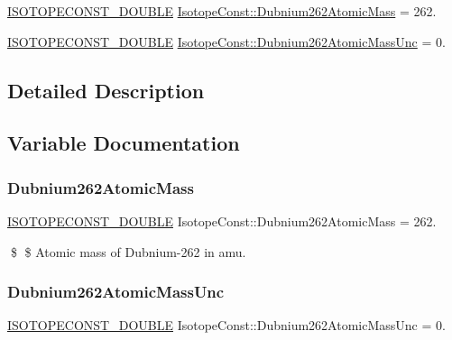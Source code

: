 \begin{DoxyCompactItemize}
\item 
\mbox{\hyperlink{group___isotope_const-_macros_ga8f45a7272ce02c0b4c65c44636ed719a}{I\+S\+O\+T\+O\+P\+E\+C\+O\+N\+S\+T\+\_\+\+D\+O\+U\+B\+LE}} \mbox{\hyperlink{group___isotope_const-_dubnium-_db262_ga25b5041543884ed2576ce04ff62130be}{Isotope\+Const\+::\+Dubnium262\+Atomic\+Mass}} = 262.
\item 
\mbox{\hyperlink{group___isotope_const-_macros_ga8f45a7272ce02c0b4c65c44636ed719a}{I\+S\+O\+T\+O\+P\+E\+C\+O\+N\+S\+T\+\_\+\+D\+O\+U\+B\+LE}} \mbox{\hyperlink{group___isotope_const-_dubnium-_db262_gab2563b2fbfc673e651de304e38cac9b5}{Isotope\+Const\+::\+Dubnium262\+Atomic\+Mass\+Unc}} = 0.
\end{DoxyCompactItemize}


\subsection{Detailed Description}


\subsection{Variable Documentation}
\mbox{\label{group___isotope_const-_dubnium-_db262_ga25b5041543884ed2576ce04ff62130be}} 
\subsubsection{\texorpdfstring{Dubnium262\+Atomic\+Mass}{Dubnium262AtomicMass}}
{\footnotesize\ttfamily \mbox{\hyperlink{group___isotope_const-_macros_ga8f45a7272ce02c0b4c65c44636ed719a}{I\+S\+O\+T\+O\+P\+E\+C\+O\+N\+S\+T\+\_\+\+D\+O\+U\+B\+LE}} Isotope\+Const\+::\+Dubnium262\+Atomic\+Mass = 262.}

\$ \$ Atomic mass of Dubnium-\/262 in amu. \mbox{\label{group___isotope_const-_dubnium-_db262_gab2563b2fbfc673e651de304e38cac9b5}} 
\subsubsection{\texorpdfstring{Dubnium262\+Atomic\+Mass\+Unc}{Dubnium262AtomicMassUnc}}
{\footnotesize\ttfamily \mbox{\hyperlink{group___isotope_const-_macros_ga8f45a7272ce02c0b4c65c44636ed719a}{I\+S\+O\+T\+O\+P\+E\+C\+O\+N\+S\+T\+\_\+\+D\+O\+U\+B\+LE}} Isotope\+Const\+::\+Dubnium262\+Atomic\+Mass\+Unc = 0.}

